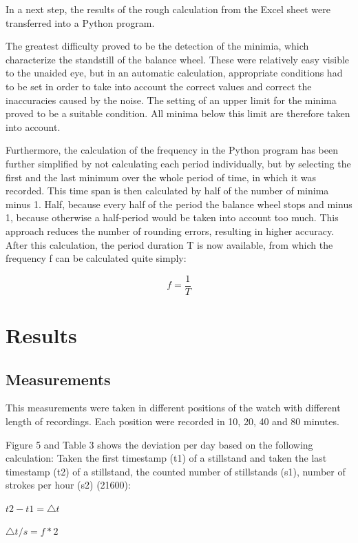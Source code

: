 \documentclass[12pt, a4paper]{report}
\begin{document}
In a next step, the results of the rough calculation from the Excel sheet were transferred into a Python program. 

The greatest difficulty proved to be the detection of the minimia, which characterize the standstill of the balance wheel. These were relatively easy visible to the unaided eye, but in an automatic calculation, appropriate conditions had to be set in order to take into account the correct values and correct the inaccuracies caused by the noise. The setting of an upper limit for the minima proved to be a suitable condition. All minima below this limit are therefore taken into account. 

Furthermore, the calculation of the frequency in the Python program has been further simplified by not calculating each period individually, but by selecting the first and the last minimum over the whole period of time, in which it was recorded. This time span is then calculated by half of the number of minima minus 1. Half, because every half of the period the balance wheel stops and minus 1, because otherwise a half-period would be taken into account too much. This approach reduces the number of rounding errors, resulting in higher accuracy. After this calculation, the period duration T is now available, from which the frequency f can be calculated quite simply: 

 \begin{displaymath}
  f = \frac{1}{T}
 \end{displaymath}

\chapter{Results}

\section{Measurements}
This measurements were taken in different positions of the watch with different length
of recordings. Each position were recorded in 10, 20, 40 and 80 minutes.

Figure 5 and Table 3 shows the deviation per day based on the following calculation:
Taken the first timestamp (t1) of a stillstand and taken the last timestamp (t2) of a stillstand, the counted
number of stillstands (s1), number of strokes per hour (s2) (21600):
\bigskip

\(t2-t1 = \triangle t\)

\(\triangle t / s = f*2\)
\end{document}

